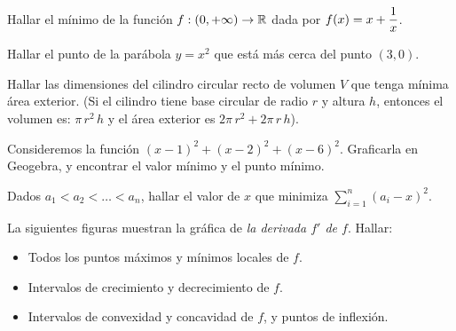 
\item Hallar el mínimo de la función $f:(0,+\infty)\to \mathbb{R}$ dada por $\displaystyle f(x) = x + \frac1x$.

\item Hallar el punto de la parábola $y=x^2$ que está más cerca del punto $(3,0)$.

\item Hallar las dimensiones del cilindro circular recto de volumen $V$ que tenga mínima área exterior. (Si el cilindro tiene base circular de radio $r$ y altura $h$, entonces el volumen es: $\pi \, r^2\, h$ y el área exterior es $2\pi \, r^2 + 2 \pi \, r\, h$).

\item Consideremos la función $(x-1)^2+(x-2)^2+(x-6)^2$. Graficarla en Geogebra, y encontrar el valor mínimo y el punto mínimo.

\item Dados $a_1<a_2<\dots <a_n$, hallar el valor de $x$ que minimiza $\sum_{i=1}^n (a_i-x)^2$.

\item La siguientes figuras muestran la gráfica de \emph{la derivada $f'$ de $f$}. Hallar:
\begin{itemize}
  \item Todos los puntos máximos y mínimos locales de $f$.
  \item Intervalos de crecimiento y decrecimiento de $f$.
  \item Intervalos de convexidad y concavidad de $f$, y puntos de inflexión.
\end{itemize} 


